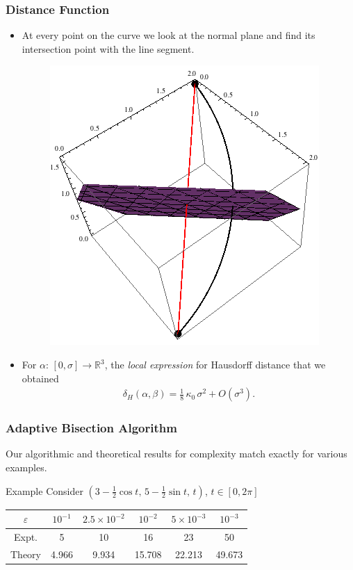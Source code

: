 \documentclass[ucs,9pt,pagenumbersfull]{beamer}
\begin{document}
\begin{frame}
  \frametitle{Distance Function}
  \begin{itemize}
  \item At every point on the curve we look at the normal plane and
    find its intersection point with the line segment.
    \begin{figure}
      \centering
      \includegraphics[scale=0.25]{Figures/distance_fn.png}
    \end{figure}
  \item For \(\alpha : \,[0,\sigma] \rightarrow \mathbb{R}^3\), the \emph{local expression} for Hausdorff distance that we obtained
    \begin{align*}
      \delta_H(\alpha, \beta) = \frac{1}{8}\,\kappa_0\,\sigma^2+O(\sigma^3).
    \end{align*}
  \end{itemize}
\end{frame}

\begin{frame}
  \frametitle {Adaptive Bisection Algorithm}

  Our algorithmic and theoretical results for complexity match
  exactly for various examples.

    \begin{block}{Example}
      Consider \((3-\tfrac{1}{2}\cos t,\, 5-\tfrac{1}{2}\sin
      t,\, t)\), \(t \in [0, 2\pi]\)

      \begin{center}
        \begin{tabular}{|c|c|c|c|c|c|}
          \hline
          \(\varepsilon\) & \(10^{-1}\) & \(2.5 \times 10^{-2}\) &
          \(10^{-2}\) & \(5 \times 10^{-3}\) & \(10^{-3}\) \\ \hline
          Expt. & 5 & 10 & 16 & 23 & 50 \\ \hline
          Theory & 4.966 & 9.934 & 15.708 & 22.213 & 49.673 \\ \hline
        \end{tabular}
      \end{center}
    \end{block}
\end{frame}
\end{document}
